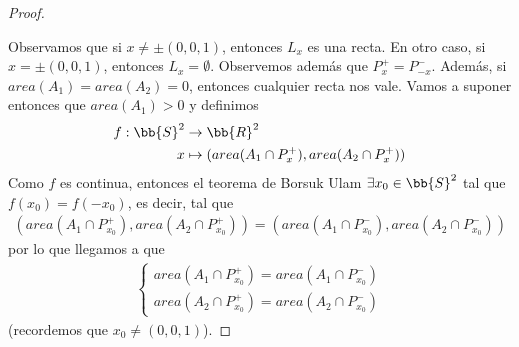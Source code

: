 \begin{teo}
\begin{proof}
\begin{figure}[H]
        \end{figure}

        Observamos que si $x\neq \pm (0,0,1)$, entonces $L_x$ es una recta. En otro caso, si $x= \pm (0,0,1)$, entonces $L_x=\emptyset$. Observemos además que $P_x^+=P_{-x}^-$. Además, si $area(A_1)=area(A_2)=0$, entonces cualquier recta nos vale. Vamos a suponer entonces que $area(A_1)>0$ y definimos
        \begin{align*}
            f: \bb{S}^2 & \to \bb{R}^2\\
            x & \mapsto (area(A_1\cap P_x^+), area(A_2\cap P_x^+))
        \end{align*}
        Como $f$ es continua, entonces el teorema de Borsuk Ulam $\exists x_0\in \bb{S}^2$ tal que $f(x_0)=f(-x_0)$, es decir, tal que
        \begin{gather*}
            (area(A_1\cap P_{x_0}^+), area(A_2\cap P_{x_0}^+)) = (area(A_1\cap P_{x_0}^-), area(A_2\cap P_{x_0}^-))
        \end{gather*}
        por lo que llegamos a que 
        \begin{gather*}
            \left\{
                \begin{array}{l}
                    area(A_1\cap P_{x_0}^+) = area(A_1\cap P_{x_0}^-)\\
                    area(A_2\cap P_{x_0}^+) = area(A_2\cap P_{x_0}^-)
                \end{array}
            \right.
        \end{gather*}
        (recordemos que $x_0\neq (0,0,1)$).
    \end{proof}
\end{teo}

